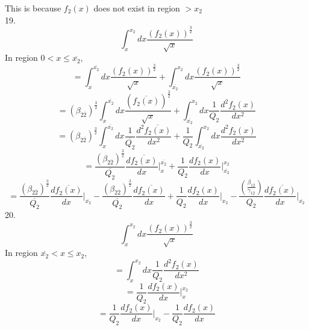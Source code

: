 \documentclass[fleqn, 10pt]{article}
\begin{document}
                This is because $f_2(x)$ does not exist in region $> x_2$ \\
19. 
\begin{equation*}
    \int^{x_2}_{x} dx \frac{(f_2(x))^\frac{3}{2}}{\sqrt{x}}
\end{equation*}
In region $0<x\leq \overline{x_2}$,
\begin{equation*}
    = \int^{\overline{x_2}}_{x} dx \frac{(f_2(x))^\frac{3}{2}}{\sqrt{x}} + \int^{x_2}_{\overline{x_2}} dx \frac{(f_2(x))^\frac{3}{2}}{\sqrt{x}}
\end{equation*}
\begin{equation*}
    = (\beta_{2\overline{2}})^\frac{3}{2} \int^{\overline{x_2}}_{x} dx \frac{(\overline{f_2(x)})^\frac{3}{2}}{\sqrt{x}} + \int^{x_2}_{\overline{x_2}} dx \frac{1}{Q_2} \frac{d^2f_2(x)}{dx^2}
\end{equation*}
\begin{equation*}
    = (\beta_{2\overline{2}})^\frac{3}{2} \int^{\overline{x_2}}_{x} dx \frac{1}{\overline{Q_2}} \frac{d^2\overline{f_2(x)}}{dx^2} + \frac{1}{Q_2} \int^{x_2}_{\overline{x_2}} dx \frac{d^2f_2(x)}{dx^2}
\end{equation*}
\begin{equation*}
    =   \frac{(\beta_{2\overline{2}})^\frac{3}{2}}{\overline{Q_2}} \frac{d\overline{f_2(x)}}{dx}\Bigg|^{\overline{x_2}}_{x} +   \frac{1}{Q_2} \frac{df_2(x)}{dx}\Bigg|^{x_2}_{\overline{x_2}}
\end{equation*}
\begin{equation}
    =   \frac{(\beta_{2\overline{2}})^\frac{3}{2}}{\overline{Q_2}} \frac{d\overline{f_2(x)}}{dx}\Bigg|_{\overline{x_2}} - \frac{(\beta_{2\overline{2}})^\frac{3}{2}}{\overline{Q_2}} \frac{d\overline{f_2(x)}}{dx} +   \frac{1}{Q_2} \frac{df_2(x)}{dx}\Bigg|_{x_2} -   \frac{\left(\frac{\beta_{1\overline{2}}}{\gamma_{12}}\right)}{Q_2} \frac{d\overline{f_2(x)}}{dx}\Bigg|_{\overline{x_2}}
    \label{57}
\end{equation}
20.
\begin{equation*}
    \int^{x_2}_{x} dx \frac{(f_2(x))^\frac{3}{2}}{\sqrt{x}}
\end{equation*}
In region $\overline{x_2}<x \leq x_2$,
\begin{equation*}
    = \int^{x_2}_{x} dx \frac{1}{Q_2}\frac{d^2f_2(x)}{dx^2}
\end{equation*}
\begin{equation*}
    =   \frac{1}{Q_2} \frac{df_2(x)}{dx} \Bigg|^{x_2}_{x}
\end{equation*}
\begin{equation}
    =  \frac{1}{Q_2} \frac{df_2(x)}{dx}\Bigg|_{x_2} - \frac{1}{Q_2} \frac{df_2(x)}{dx}
    \label{58}
\end{equation}
\end{document}
